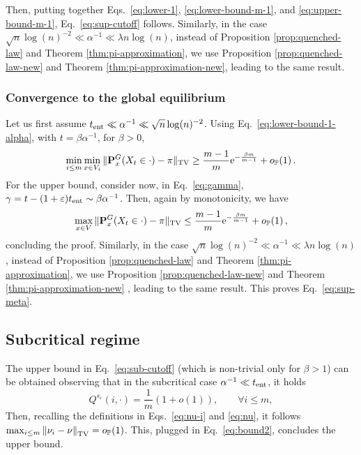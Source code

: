 \documentclass[11pt,oneside]{amsart}
\numberwithin{equation}{section}  %
\theoremstyle{plain}
\newcommand{\eps}{\varepsilon}
\newcommand{\p}{\mathbb{P}}
\newcommand{\op}{o_{\p}}
\newcommand{\tv}[1]{\left\|#1\right\|_{\rm TV}}
\newcommand{\tent}{t_{\textup{ent}}}
\newcommand{\quenchG}{\mathbf{P}^G}
\newcommand{\muins}{\mu_{\s}^{c(x)}}
\newcommand{\semi}{{Q}}
\newcommand{\s}{{s_\eps}}
\begin{document}
Then, putting together Eqs.~\eqref{eq:lower-1}, \eqref{eq:lower-bound-m-1}, and \eqref{eq:upper-bound-m-1}, Eq.~\eqref{eq:sup-cutoff} follows.
Similarly, in the case $\sqrt{n}\log(n)^{-2}\ll\alpha^{-1} \ll \lambda n \log(n) $, instead of Proposition \ref{prop:quenched-law} and Theorem \ref{thm:pi-approximation}, we use Proposition \ref{prop:quenched-law-new} and Theorem \ref{thm:pi-approximation-new}, leading to the same result.

\subsubsection{Convergence to the global equilibrium}
Let us first assume
$\tent\ll\alpha^{-1} \ll \sqrt{n}\log(n)^{-2}$. Using Eq.~\eqref{eq:lower-bound-1-alpha}, with $t=\beta\alpha^{-1}$, for $\beta>0$,
\begin{equation}
	\min_{i \le m}\min_{x\in V_i}\|\quenchG_x(X_t\in\cdot)-\pi\|_{\rm TV} \ge \frac{m-1}{m}{\rm e}^{-\frac{\beta m}{m-1}}+\op(1)\,.
\end{equation}
For the upper bound, consider now, in Eq.~\eqref{eq:gamma}, $\gamma=t-(1+\eps)\tent \sim\beta\alpha^{-1}$. Then, again by monotonicity, we have
\begin{equation}
	\max_{x\in V}\|\quenchG_x(X_t\in\cdot)-\pi\|_{\rm TV} \le \frac{m-1}{m}{\rm e}^{-\frac{\beta m}{m-1}}+\op(1)\,,
\end{equation}
concluding the proof. Similarly, in the case $\sqrt{n}\log(n)^{-2}\ll\alpha^{-1} \ll\lambda n \log(n) $, instead of Proposition \ref{prop:quenched-law} and Theorem \ref{thm:pi-approximation}, we use Proposition \ref{prop:quenched-law-new} and Theorem \ref{thm:pi-approximation-new} , leading to the same result. This proves Eq.~\eqref{eq:sup-meta}.

\subsection{Subcritical regime}
{The upper bound} in Eq.~\eqref{eq:sub-cutoff} (which is non-trivial only for $\beta>1$) can be obtained observing that in the subcritical case $\alpha^{-1} \ll \tent$, it holds
\begin{equation} 
	{\semi^{\s}(i,\cdot)}=\frac{1}{m}(1+o(1)), \qquad \forall i \le m,
\end{equation}
Then, recalling the definitions in Eqs.~\eqref{eq:nu-i} and \eqref{eq:nu}, it follows $\max_{i \le m}\tv{\nu_{i}-\nu}=\op(1)$. This, plugged in Eq.~\eqref{eq:bound2},
 concludes the upper bound.
\end{document}

